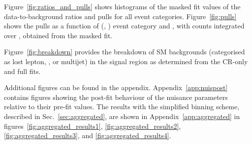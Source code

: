 
Figure~\ref{fig:ratios_and_pulls} shows histograms of the masked fit
values of the data-to-background ratios and pulls for all event
categories. Figure~\ref{fig:pulls} shows the pulls as a function of
(\njet, \nb) event category and \scalht, with counts integrated over
\mht, obtained from the masked fit.

Figure~\ref{fig:breakdown} provides the breakdown of SM backgrounds
(categorised as lost lepton, \znunuj, or multijet) in the signal
region as determined from the CR-only and full fits.

Additional figures can be found in the appendix.
Appendix~\ref{app:nuispost}
contains figures showing the post-fit behaviour of the nuisance
parameters relative to their pre-fit values.
The results with the simplified binning scheme, described in
Sec.~\ref{sec:aggregated}, are shown in Appendix~\ref{app:aggregated} in
figures~\ref{fig:aggregated_results1},
\ref{fig:aggregated_results2}, \ref{fig:aggregated_results3}, and
\ref{fig:aggregated_results4}.

